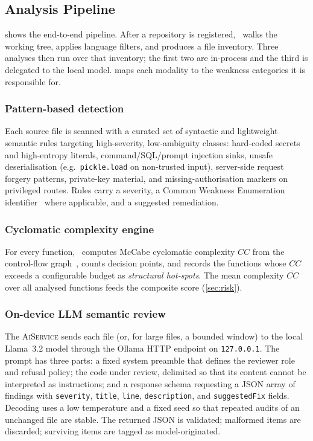 \subsection{Analysis Pipeline}
\label{sec:pipeline}


 shows the end-to-end pipeline. After a repository is
registered, \cs\ walks the working tree, applies language filters, and
produces a file inventory. Three analyses then run over that inventory;
the first two are in-process and the third is delegated to the local
model.  maps each modality to the weakness
categories it is responsible for.



\subsubsection{Pattern-based detection}
Each source file is scanned with a curated set of syntactic and
lightweight semantic rules targeting high-severity, low-ambiguity
classes: hard-coded secrets and high-entropy literals, command/SQL/prompt
injection sinks, unsafe deserialisation (e.g.\ \texttt{pickle.load} on
non-trusted input), server-side request forgery patterns, private-key
material, and missing-authorisation markers on privileged routes. Rules
carry a severity, a Common Weakness Enumeration
identifier~\cite{mitrecwe} where applicable, and a suggested remediation.

\subsubsection{Cyclomatic complexity engine}
For every function, \cs\ computes McCabe cyclomatic complexity $CC$ from
the control-flow graph~\cite{mccabe1976}, counts decision points, and
records the functions whose $CC$ exceeds a configurable budget as
\emph{structural hot-spots}. The mean complexity $\overline{CC}$ over all
analysed functions feeds the composite score (\cref{sec:risk}).

\subsubsection{On-device LLM semantic review}
\label{sec:llm}
The \textsc{AiService} sends each file (or, for large files, a bounded
window) to the local \mbox{Llama~3.2} model through the Ollama HTTP
endpoint on \texttt{127.0.0.1}. The prompt has three parts: a fixed
system preamble that defines the reviewer role and refusal policy; the
code under review, delimited so that its content cannot be interpreted as
instructions; and a response schema requesting a JSON array of findings
with \texttt{severity}, \texttt{title}, \texttt{line},
\texttt{description}, and \texttt{suggestedFix} fields. Decoding uses a
low temperature and a fixed seed so that repeated audits of an unchanged
file are stable. The returned JSON is validated; malformed items are
discarded; surviving items are tagged as model-originated.

